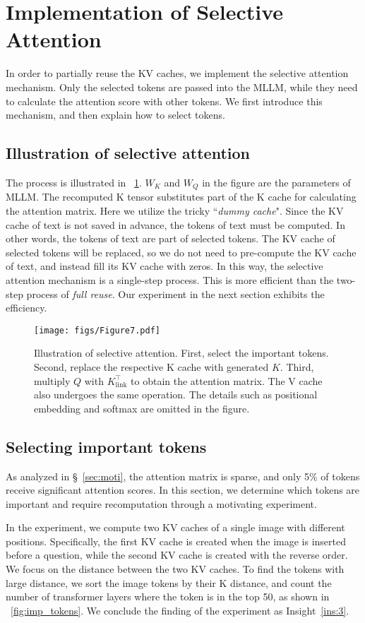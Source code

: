 \section{Implementation of Selective Attention}
In order to partially reuse the KV caches, we implement the selective attention mechanism. Only the selected tokens are passed into the MLLM, while they need to calculate the attention score with other tokens. We first introduce this mechanism, and then explain how to select tokens.
\subsection{Illustration of selective attention}
The process is illustrated in \figurename~\ref{fig:7}. $W_K$ and $W_Q$ in the figure are the parameters of MLLM. The recomputed K tensor substitutes part of the K cache for calculating the attention matrix. Here we utilize the tricky ``\textit{dummy cache}". Since the KV cache of text is not saved in advance, the tokens of text must be computed. In other words, the tokens of text are part of selected tokens. The KV cache of selected tokens will be replaced, so we do not need to pre-compute the KV cache of text, and instead fill its KV cache with zeros. In this way, the selective attention mechanism is a single-step process. This is more efficient than the two-step process of \textit{full reuse}. Our experiment in the next section exhibits the efficiency.

\begin{figure}
    \centering
    \texttt{[image: figs/Figure7.pdf]}
    \caption{Illustration of selective attention. First, select the important tokens. Second, replace the respective K cache with generated $K$. Third, multiply $Q$ with $K_\text{link}^\top$ to obtain the attention matrix. The V cache also undergoes the same operation. The details such as positional embedding and softmax are omitted in the figure.}
    \label{fig:7}
\end{figure}

\subsection{Selecting important tokens}
As analyzed in \S~\ref{sec:moti}, the attention matrix is sparse, and only 5\% of tokens receive significant attention scores. In this section, we determine which tokens are important and require recomputation through a motivating experiment.

In the experiment, we compute two KV caches of a single image with different positions. Specifically, the first KV cache is created when the image is inserted before a question, while the second KV cache is created with the reverse order. We focus on the distance between the two KV caches. To find the tokens with large distance, we sort the image tokens by their K distance, and count the number of transformer layers where the token is in the top 50, as shown in \figurename~\ref{fig:imp_tokens}. We conclude the finding of the experiment as Insight~\ref{ins:3}.

